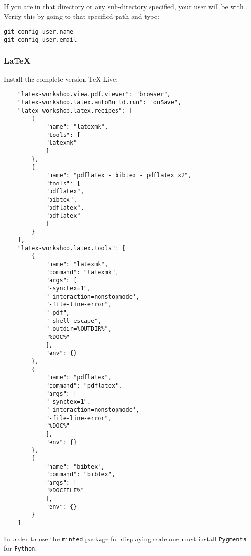 If you are in that directory or any sub-directory specified, your user will be  with . Verify this by going to that specified path and type:

\begin{verbatim}
git config user.name
git config user.email
\end{verbatim}



\subsubsection{LaTeX}

Install the complete version TeX Live:



\begin{verbatim}
    "latex-workshop.view.pdf.viewer": "browser",
    "latex-workshop.latex.autoBuild.run": "onSave",
    "latex-workshop.latex.recipes": [
        {
            "name": "latexmk",
            "tools": [
            "latexmk"
            ]
        },
        {
            "name": "pdflatex - bibtex - pdflatex x2",
            "tools": [
            "pdflatex",
            "bibtex",
            "pdflatex",
            "pdflatex"
            ]
        }
    ],
    "latex-workshop.latex.tools": [
        {
            "name": "latexmk",
            "command": "latexmk",
            "args": [
            "-synctex=1",
            "-interaction=nonstopmode",
            "-file-line-error",
            "-pdf",
            "-shell-escape",
            "-outdir=%OUTDIR%",
            "%DOC%"
            ],
            "env": {}
        },
        {
            "name": "pdflatex",
            "command": "pdflatex",
            "args": [
            "-synctex=1",
            "-interaction=nonstopmode",
            "-file-line-error",
            "%DOC%"
            ],
            "env": {}
        },
        {
            "name": "bibtex",
            "command": "bibtex",
            "args": [
            "%DOCFILE%"
            ],
            "env": {}
        }
    ]
\end{verbatim}


In order to use the \texttt{minted} package for displaying code one must install \texttt{Pygments} for \texttt{Python}.

